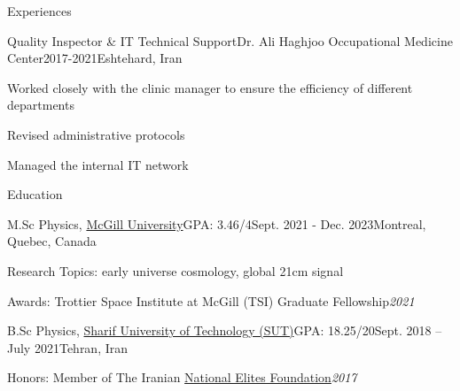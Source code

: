 \documentclass[]{kyvernitis-resume}
\begin{document}
\begin{section}{Experiences}
    \begin{subsection}
        {Quality Inspector \& IT Technical Support}{Dr. Ali Haghjoo Occupational Medicine Center}{2017-2021}{Eshtehard, Iran}
        \item Worked closely with the clinic manager to ensure the efficiency of different departments
        \item Revised administrative protocols
        \item Managed the internal IT network 
    \end{subsection} 
   
\end{section}
\vspace{-0.3mm}
\begin{section}{Education}
    \begin{subsection}{M.Sc Physics, \href{https://www.physics.mcgill.ca/}{McGill University}}{GPA: 3.46/4}{Sept. 2021 - Dec. 2023}{Montreal, Quebec, Canada}
        \item{Research Topics: early universe cosmology, global 21cm signal}
        \item{Awards: Trottier Space Institute at McGill (TSI) Graduate Fellowship}{\hfill \textit{2021}}
    \end{subsection}
\vspace{-0.3mm}    
    \begin{subsection}{B.Sc Physics, \href{http://physics.sharif.ir/~phyweb/}{ Sharif University of Technology (SUT)}}{GPA: 18.25/20}{Sept. 2018 – July 2021}{Tehran, Iran}
        \item{Honors: Member of The Iranian \href{https://en.bmn.ir/}{National Elites Foundation}}{\hfill \textit{2017}}
    \end{subsection}
\end{section}
\end{document}
